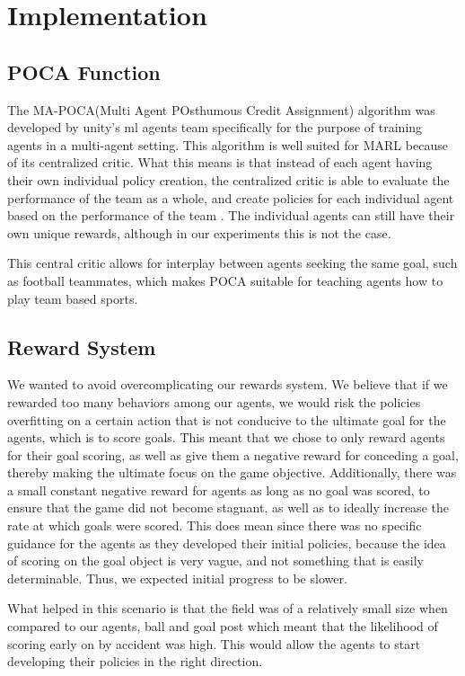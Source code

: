 \documentclass{LSkill}
\begin{document}
\section{Implementation}
\label{sec:implementation}

\subsection{POCA Function}
The MA-POCA(Multi Agent POsthumous Credit Assignment) algorithm was developed by unity’s ml agents team specifically for the purpose of training agents in a multi-agent setting. This algorithm is well suited for MARL because of its centralized critic. What this means is that instead of each agent having their own individual policy creation, the centralized critic is able to evaluate the performance of the team as a whole, and create policies for each individual agent based on the performance of the team \cite{Cohen2022}. The individual agents can still have their own unique rewards, although in our experiments this is not the case.

This central critic allows for interplay between agents seeking the same goal, such as football teammates, which makes POCA suitable for teaching agents how to play team based sports. 

\subsection{Reward System}
We wanted to avoid overcomplicating our rewards system. We believe that if we rewarded too many behaviors among our agents, we would risk the policies overfitting on a certain action that is not conducive to the ultimate goal for the agents, which is to score goals.
This meant that we chose to only reward agents for their goal scoring, as well as give them a negative reward for conceding a goal, thereby making the ultimate focus on the game objective. Additionally, there was a small constant negative reward for agents as long as no goal was scored, to ensure that the game did not become stagnant, as well as to ideally increase the rate at which goals were scored. This does mean since there was no specific guidance for the agents as they developed their initial policies, because the idea of scoring on the goal object is very vague, and not something that is easily determinable. Thus, we expected initial progress to be slower. 

What helped in this scenario is that the field was of a relatively small size when compared to our agents, ball and goal post which meant that the likelihood of scoring early on by accident was high. This would allow the agents to start developing their policies in the right direction. 
\end{document}

